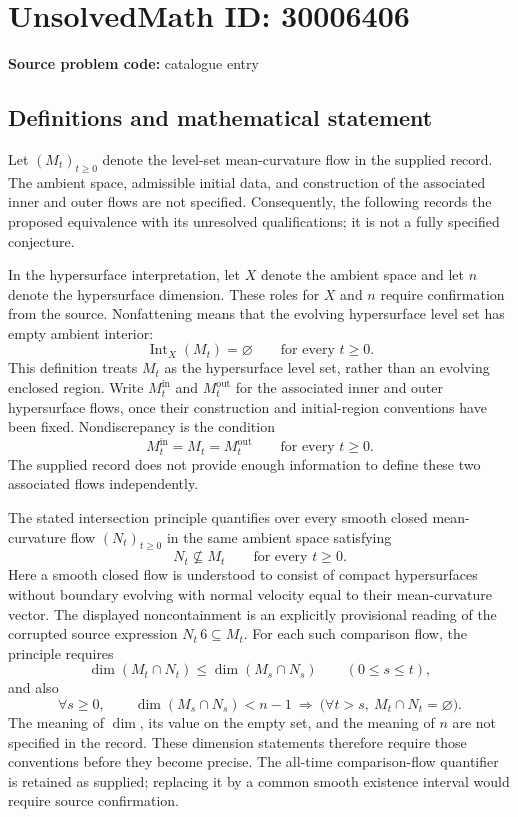 \documentclass[11pt]{article}
\begin{document}
\section*{UnsolvedMath ID: 30006406}
\textbf{Source problem code:} catalogue entry
\subsection{Definitions and mathematical statement}
Let \((M_t)_{t\geq0}\) denote the level-set mean-curvature flow in the supplied record. The ambient space, admissible initial data, and construction of the associated inner and outer flows are not specified. Consequently, the following records the proposed equivalence with its unresolved qualifications; it is not a fully specified conjecture.

In the hypersurface interpretation, let \(X\) denote the ambient space and let \(n\) denote the hypersurface dimension. These roles for \(X\) and \(n\) require confirmation from the source. Nonfattening means that the evolving hypersurface level set has empty ambient interior:
\[
\operatorname{Int}_X(M_t)=\varnothing\qquad\text{for every }t\geq0.
\]
This definition treats \(M_t\) as the hypersurface level set, rather than an evolving enclosed region. Write \(M_t^{\mathrm{in}}\) and \(M_t^{\mathrm{out}}\) for the associated inner and outer hypersurface flows, once their construction and initial-region conventions have been fixed. Nondiscrepancy is the condition
\[
M_t^{\mathrm{in}}=M_t=M_t^{\mathrm{out}}
\qquad\text{for every }t\geq0.
\]
The supplied record does not provide enough information to define these two associated flows independently.

The stated intersection principle quantifies over every smooth closed mean-curvature flow \((N_t)_{t\geq0}\) in the same ambient space satisfying
\[
N_t\not\subseteq M_t\qquad\text{for every }t\geq0.
\]
Here a smooth closed flow is understood to consist of compact hypersurfaces without boundary evolving with normal velocity equal to their mean-curvature vector. The displayed noncontainment is an explicitly provisional reading of the corrupted source expression \(N_t\,6\subseteq M_t\). For each such comparison flow, the principle requires
\[
\dim(M_t\cap N_t)\leq\dim(M_s\cap N_s)
\qquad(0\leq s\leq t),
\]
and also
\[
\forall s\geq0,\qquad
\dim(M_s\cap N_s)<n-1
\ \Longrightarrow\
\bigl(\forall t>s,\ M_t\cap N_t=\varnothing\bigr).
\]
The meaning of \(\dim\), its value on the empty set, and the meaning of \(n\) are not specified in the record. These dimension statements therefore require those conventions before they become precise. The all-time comparison-flow quantifier is retained as supplied; replacing it by a common smooth existence interval would require source confirmation.
\end{document}
